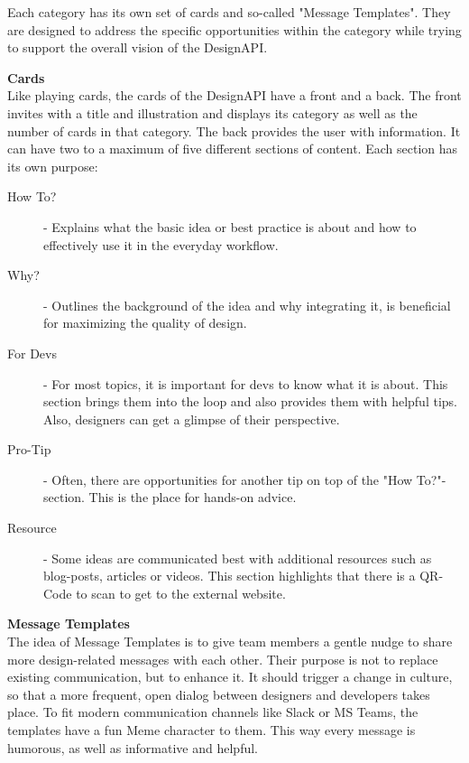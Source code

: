 Each category has its own set of cards and so-called "Message Templates". They are designed to
address the specific opportunities within the category while trying to support the overall vision of
the DesignAPI.

\textbf{Cards}\\
Like playing cards, the cards of the DesignAPI have a front and a back. The front invites with a
title and illustration and displays its category as well as the number of cards in that category.
The back provides the user with information. It can have two to a maximum of five different sections
of content. Each section has its own purpose:

\begin{description}
    \item[How To?] - Explains what the basic idea or best practice is about and how to
          effectively use it in the everyday workflow.

    \item[Why?] - Outlines the background of the idea and why integrating it, is beneficial for
          maximizing the quality of design.

    \item[For Devs] - For most topics, it is important for devs to know what it is about. This
          section brings them into the loop and also provides them with helpful tips. Also,
          designers can get a glimpse of their perspective.

    \item[Pro-Tip] - Often, there are opportunities for another tip on top of the "How To?"-section.
          This is the place for hands-on advice.

    \item[Resource] - Some ideas are communicated best with additional resources such as blog-posts,
          articles or videos. This section highlights that there is a QR-Code to scan to get to the
          external website.
\end{description}

\textbf{Message Templates}\\
The idea of Message Templates is to give team members a gentle nudge to share more design-related
messages with each other. Their purpose is not to replace existing communication, but to enhance it.
It should trigger a change in culture, so that a more frequent, open dialog between designers and
developers takes place.
To fit modern communication channels like Slack or MS Teams, the templates have a fun Meme character
to them. This way every message is humorous, as well as informative and helpful.

